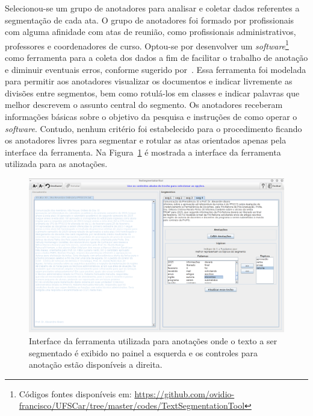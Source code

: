 Selecionou-se um grupo de anotadores para analisar e coletar dados referentes a segmentação de cada ata. O grupo de anotadores foi formado por profissionais com alguma afinidade com atas de reunião, como profissionais administrativos, professores e coordenadores de curso. Optou-se por desenvolver um \textit{software}\footnote{Códigos fontes disponíveis em: \url{https://github.com/ovidio-francisco/UFSCar/tree/master/codes/TextSegmentationTool} } como ferramenta para a coleta dos dados a fim de facilitar o trabalho de anotação e diminuir eventuais erros, conforme sugerido por~\cite{Hovy2010}. Essa ferramenta foi modelada para permitir aos anotadores visualizar os documentos e indicar livremente as divisões entre segmentos, bem como rotulá-los em classes e indicar palavras que melhor descrevem o assunto central do segmento.
Os anotadores receberam informações básicas sobre o objetivo da pesquisa e instruções de como operar o \textit{software}. Contudo, nenhum critério foi estabelecido para o procedimento ficando os anotadores livres para segmentar e rotular as atas orientados apenas pela interface da ferramenta. Na Figura~\ref{fig:interfaceanotacoes} é mostrada a interface da ferramenta utilizada para as anotações.

  \begin{figure}[!h]
	  \centering
	  \includegraphics[width=1\textwidth]{conteudo/capitulos/figs/interface-anotacoes.png}
	  \caption{Interface da ferramenta utilizada para anotações onde o texto a ser segmentado é exibido no painel a esquerda e os controles para anotação estão disponíveis a direita.}
	  \label{fig:interfaceanotacoes}
  \end{figure}





